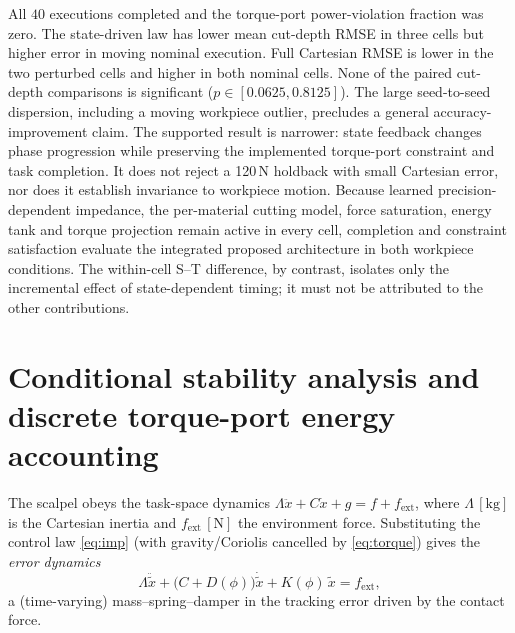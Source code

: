 \documentclass[11pt,a4paper]{article}
\newcommand{\unit}[1]{\,[\mathrm{#1}]}
\begin{document}
All $40$ executions completed and the torque-port power-violation fraction was
zero.  The state-driven law has lower mean cut-depth RMSE in three cells but
higher error in moving nominal execution. Full Cartesian RMSE is lower in the
two perturbed cells and higher in both nominal cells. None of the paired
cut-depth comparisons is significant ($p\in[0.0625,0.8125]$). The large
seed-to-seed dispersion, including a moving
workpiece outlier, precludes a general accuracy-improvement claim. The supported
result is narrower: state feedback changes phase progression while preserving
the implemented torque-port constraint and task completion. It does not reject
a 120\,N holdback with small Cartesian error, nor does it establish invariance
to workpiece motion.
Because learned precision-dependent impedance, the per-material cutting model,
force saturation, energy tank and torque projection remain active in every
cell, completion and constraint satisfaction evaluate the integrated proposed
architecture in both workpiece conditions.  The within-cell S--T difference,
by contrast, isolates only the incremental effect of state-dependent timing;
it must not be attributed to the other contributions.

\section{Conditional stability analysis and discrete torque-port energy accounting}
\label{sec:stab}
The scalpel obeys the task-space dynamics $\Lambda\ddot x+C\dot x+g=f+f_{\text{ext}}$, where $\Lambda\unit{kg}$ is
the Cartesian inertia and $f_{\text{ext}}\unit{N}$ the environment force.
Substituting the control law \eqref{eq:imp} (with gravity/Coriolis cancelled by
\eqref{eq:torque}) gives the \emph{error dynamics}
\begin{equation}
\Lambda\ddot{\tilde x}+\big(C+D(\phi)\big)\dot{\tilde x}+K(\phi)\,\tilde x=f_{\text{ext}} ,
\label{eq:err}
\end{equation}
a (time-varying) mass--spring--damper in the tracking error driven by the contact
force.
\end{document}

